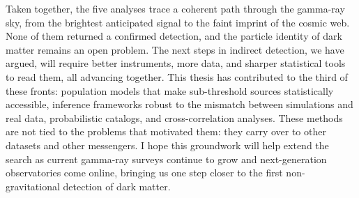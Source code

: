 Taken together, the five analyses trace a coherent path through the gamma-ray sky, from the brightest anticipated signal to the faint imprint of the cosmic web. None of them returned a confirmed detection, and the particle identity of dark matter remains an open problem. The next steps in indirect detection, we have argued, will require better instruments, more data, and sharper statistical tools to read them, all advancing together. This thesis has contributed to the third of these fronts: population models that make sub-threshold sources statistically accessible, inference frameworks robust to the mismatch between simulations and real data, probabilistic catalogs, and cross-correlation analyses. These methods are not tied to the problems that motivated them: they carry over to other datasets and other messengers. I hope this groundwork will help extend the search as current gamma-ray surveys continue to grow and next-generation observatories come online, bringing us one step closer to the first non-gravitational detection of dark matter.
